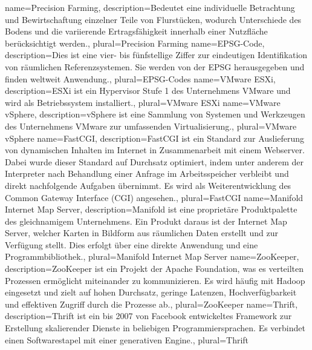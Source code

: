 {
  name=Precision Farming,
  description={Bedeutet eine individuelle Betrachtung und Bewirtschaftung einzelner Teile von Flurstücken, wodurch Unterschiede des Bodens und die variierende Ertragsfähigkeit innerhalb einer Nutzfläche berücksichtigt werden.},
  plural=Precision Farming
}
{
  name=EPSG-Code,
  description={Dies ist eine vier- bis fünfstellige Ziffer zur eindeutigen Identifikation von räumlichen Referenzsystemen. Sie werden von der EPSG herausgegeben und finden weltweit Anwendung.},
  plural=EPSG-Codes
}
{
  name=VMware ESXi,
  description={ESXi ist ein Hypervisor Stufe 1 des Unternehmens VMware und wird als Betriebssystem installiert.},
  plural=VMware ESXi
}
{
  name=VMware vSphere,
  description={vSphere ist eine Sammlung von Systemen und Werkzeugen des Unternehmens VMware zur umfassenden Virtualisierung.},
  plural=VMware vSphere
}
{
  name=FastCGI,
  description={FastCGI ist ein Standard zur Auslieferung von dynamischen Inhalten im Internet in Zusammenarbeit mit einem Webserver. Dabei wurde dieser Standard auf Durchsatz optimiert, indem unter anderem der Interpreter nach Behandlung einer Anfrage im Arbeitsspeicher verbleibt und direkt nachfolgende Aufgaben übernimmt. Es wird als Weiterentwicklung des Common Gateway Interface (CGI) angesehen.},
  plural=FastCGI
}
{
  name=Manifold Internet Map Server,
  description={Manifold ist eine proprietäre Produktpalette des gleichnamigem Unternehmens. Ein Produkt daraus ist der Internet Map Server, welcher Karten in Bildform aus räumlichen Daten erstellt und zur Verfügung stellt. Dies erfolgt über eine direkte Anwendung und eine Programmbibliothek.},
  plural=Manifold Internet Map Server
}
{
  name=ZooKeeper,
  description={ZooKeeper ist ein Projekt der Apache Foundation, was es verteilten Prozessen ermöglicht miteinander zu kommunizieren. Es wird häufig mit Hadoop eingesetzt und zielt auf hohen Durchsatz, geringe Latenzen, Hochverfügbarkeit und effektiven Zugriff durch die Prozesse ab.},
  plural=ZooKeeper
}
{
  name=Thrift,
  description={Thrift ist ein bis 2007 von Facebook entwickeltes Framework zur Erstellung skalierender Dienste in beliebigen Programmiersprachen. Es verbindet einen Softwarestapel mit einer generativen Engine.},
  plural=Thrift
}